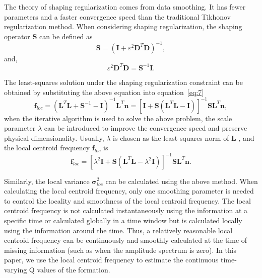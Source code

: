 The theory of shaping regularization comes from data smoothing. It has
fewer parameters and a faster convergence speed than the traditional
Tikhonov regularization method. When considering shaping
regularization, the shaping operator $\mathbf{S}$ can be defined as
\begin{equation}
  \label{eq:8}
  \mathbf{S}=(\mathbf{I}+\varepsilon^2\mathbf{D}^{T}\mathbf{D})^{-1},
\end{equation}
and,
\begin{equation}
  \label{eq:9}
  \varepsilon^2\mathbf{D}^{T}\mathbf{D}=\mathbf{S}^{-1}\mathbf{I}.
\end{equation}

The least-squares solution under the shaping regularization constraint can
be obtained by substituting the above equation into equation~\ref{eq:7}
\begin{equation}
  \label{eq:10}
  \mathbf{f}_{loc}=(\mathbf{L}^{T}\mathbf{L}+\mathbf{S}^{-1}-\mathbf{I})^{-1}
  \mathbf{L}^{T}\mathbf{n}
  =[\mathbf{I}+\mathbf{S}(\mathbf{L}^{T}\mathbf{L}-\mathbf{I})]^{-1}\mathbf{S}
  \mathbf{L}^{T}\mathbf{n},
\end{equation}
when the iterative algorithm is used to solve the above problem, the scale
parameter $\lambda$ can be introduced to improve the convergence speed and
preserve physical dimensionality. Usually, $\lambda$ is chosen as the
least-squares norm of $\mathbf{L}$ \cite[]{Fomel07a}, and the local centroid
frequency $\mathbf{f}_{loc}$ is
\begin{equation}
  \label{eq:11}
  \mathbf{f}_{loc}=[\lambda^2\mathbf{I}+\mathbf{S}(\mathbf{L}^{T}\mathbf{L}-
    \lambda^2\mathbf{I})]^{-1}\mathbf{S}\mathbf{L}^{T}\mathbf{n}.
\end{equation}

Similarly, the local variance $\mathbf{\sigma}_{loc}^2$ can be
calculated using the above method. When calculating the local centroid
frequency, only one smoothing parameter is needed to control the
locality and smoothness of the local centroid frequency. The local
centroid frequency is not calculated instantaneously using the
information at a specific time or calculated globally in a time window
but is calculated locally using the information around the time. Thus,
a relatively reasonable local centroid frequency can be continuously
and smoothly calculated at the time of missing information (such as
when the amplitude spectrum is zero). In this paper, we use the local
centroid frequency to estimate the continuous time-varying Q values of
the formation.

